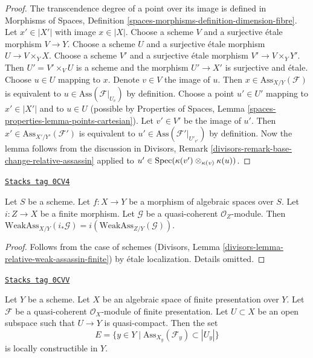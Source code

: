 \begin{proof}
The transcendence degree of a point over its image is defined in
Morphisms of Spaces, Definition
\ref{spaces-morphisms-definition-dimension-fibre}.
Let $x' \in |X'|$ with image $x \in |X|$.
Choose a scheme $V$ and a surjective \'etale morphism $V \to Y$.
Choose a scheme $U$ and a surjective
\'etale morphism $U \to V \times_Y X$. Choose a scheme $V'$
and a surjective \'etale morphism $V' \to V \times_Y Y'$.
Then $U' = V' \times_V U$ is a scheme and the morphism
$U' \to X'$ is surjective and \'etale.
Choose $u \in U$ mapping to $x$.
Denote $v \in V$ the image of $u$.
Then $x \in \text{Ass}_{X/Y}(\mathcal{F})$ is
equivalent to $u \in \text{Ass}(\mathcal{F}|_{U_v})$
by definition. Choose a point $u' \in U'$ mapping
to $x' \in |X'|$ and to $u \in U$ (possible by
Properties of Spaces, Lemma \ref{spaces-properties-lemma-points-cartesian}).
Let $v' \in V'$ be the image of $u'$.
Then $x' \in \text{Ass}_{X'/Y'}(\mathcal{F}')$ is
equivalent to $u' \in \text{Ass}(\mathcal{F}'|_{U'_{v'}})$
by definition.
Now the lemma follows from the discussion in
Divisors, Remark \ref{divisors-remark-base-change-relative-assassin}
applied to $u' \in \operatorname{Spec}(\kappa(v') \otimes_{\kappa(v)} \kappa(u))$.
\end{proof}

\begin{lemma}
\label{spaces-divisors-lemma-relative-weak-assassin-finite}
\href{https://stacks.math.columbia.edu/tag/0CV4}{\texttt{Stacks tag 0CV4}}

Let $S$ be a scheme.
Let $f : X \to Y$ be a morphism of algebraic spaces over $S$.
Let $i : Z \to X$ be a finite morphism.
Let $\mathcal{G}$ be a quasi-coherent $\mathcal{O}_Z$-module.
Then $\text{WeakAss}_{X/Y}(i_*\mathcal{G}) =
i(\text{WeakAss}_{Z/Y}(\mathcal{G}))$.
\end{lemma}

\begin{proof}
Follows from the case of schemes
(Divisors, Lemma \ref{divisors-lemma-relative-weak-assassin-finite})
by \'etale localization. Details omitted.
\end{proof}

\begin{lemma}
\label{spaces-divisors-lemma-relative-assassin-constructible}
\href{https://stacks.math.columbia.edu/tag/0CVV}{\texttt{Stacks tag 0CVV}}

Let $Y$ be a scheme. Let $X$ be an algebraic space of finite presentation
over $Y$. Let $\mathcal{F}$ be a quasi-coherent $\mathcal{O}_X$-module
of finite presentation. Let $U \subset X$ be an open subspace
such that $U \to Y$ is quasi-compact. Then the set
$$
E = \{y \in Y \mid \text{Ass}_{X_y}(\mathcal{F}_y) \subset |U_y|\}
$$
is locally constructible in $Y$.
\end{lemma}


